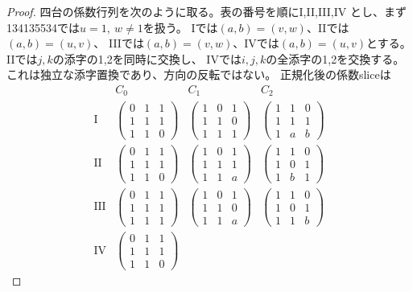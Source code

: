 \begin{proof}
四台の係数行列を次のように取る。表の番号を順にI,II,III,IV
とし、まず134135534では$u=1,\ w\ne1$を扱う。
Iでは$(a,b)=(v,w)$、IIでは$(a,b)=(u,v)$、
IIIでは$(a,b)=(v,w)$、IVでは$(a,b)=(u,v)$とする。
IIでは$j,k$の添字の1,2を同時に交換し、
IVでは$i,j,k$の全添字の1,2を交換する。
これは独立な添字置換であり、方向の反転ではない。
正規化後の係数sliceは
\[
\begin{array}{c|ccc}
 &C_0&C_1&C_2\\ \hline
\mathrm{I}&
\begin{pmatrix}0&1&1\\1&1&1\\1&1&0\end{pmatrix}&
\begin{pmatrix}1&0&1\\1&1&0\\1&1&1\end{pmatrix}&
\begin{pmatrix}1&1&0\\1&1&1\\1&a&b\end{pmatrix}\\[3pt]
\mathrm{II}&
\begin{pmatrix}0&1&1\\1&1&1\\1&1&0\end{pmatrix}&
\begin{pmatrix}1&0&1\\1&1&1\\1&1&a\end{pmatrix}&
\begin{pmatrix}1&1&0\\1&0&1\\1&b&1\end{pmatrix}\\[3pt]
\mathrm{III}&
\begin{pmatrix}0&1&1\\1&1&1\\1&1&1\end{pmatrix}&
\begin{pmatrix}1&0&1\\1&1&0\\1&1&a\end{pmatrix}&
\begin{pmatrix}1&1&0\\1&0&1\\1&1&b\end{pmatrix}\\[3pt]
\mathrm{IV}&
\begin{pmatrix}0&1&1\\1&1&1\\1&1&0\end{pmatrix}&

\end{array}\]
\end{proof}

